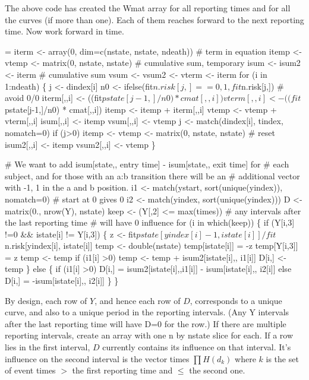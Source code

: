 \documentclass{article}
\begin{document}
The above code has created the Wmat array for all reporting times and
for all the curves (if more than one). 
Each of them reaches forward to the next reporting time.
Now work forward in time.

\begin{nwchunk}
=
 iterm <- array(0, dim=c(nstate, nstate, ndeath)) # term in equation
 itemp <- vtemp <- matrix(0, nstate, nstate)  # cumulative sum, temporary
 isum  <- isum2 <- iterm  # cumulative sum
 vsum  <- vsum2 <- vterm <- iterm
 for (i in 1:ndeath) \{
     j <- dindex[i]
     n0 <- ifelse(fit$n.risk[j,] ==0, 1, fit$n.risk[j,]) # avoid 0/0
     iterm[,,i] <- ((fit$pstate[j-1,]/n0) * cmat[,,i]) %
     vterm[,,i] <- ((fit$pstate[j-1,]/n0) * cmat[,,i]) %
     itemp <- itemp + iterm[,,i]
     vtemp <- vtemp + vterm[,,i]
     isum[,,i] <- itemp
     vsum[,,i] <- vtemp
     j <- match(dindex[i], tindex, nomatch=0)
     if (j>0) itemp <- vtemp <- matrix(0, nstate, nstate)  # reset
     isum2[,,i] <- itemp
     vsum2[,,i] <- vtemp
 \}
 
 # We want to add isum[state,, entry time] - isum[state,, exit time] for
 #  each subject, and for those with an a:b transition there will be an 
 #  additional vector with -1, 1 in the a and b position.
 i1 <- match(ystart, sort(unique(yindex)), nomatch=0) # start at 0 gives 0
 i2 <- match(yindex, sort(unique(yindex)))
 D <- matrix(0., nrow(Y), nstate)
 keep <- (Y[,2] <= max(times))  # any intervals after the last reporting time
                                 # will have 0 influence
 for (i in which(keep)) \{
     if (Y[i,3] !=0 && istate[i] != Y[i,3]) \{
         z <- fit$pstate[yindex[i]-1, istate[i]]/fit$n.risk[yindex[i], istate[i]]
         temp <- double(nstate)
         temp[istate[i]] = -z
         temp[Y[i,3]]    =  z
         temp <- temp %
         if (i1[i] >0) temp <- temp + isum2[istate[i],, i1[i]]
         D[i,] <- temp
     \}
     else \{
         if (i1[i] >0) D[i,] = isum2[istate[i],,i1[i]] - isum[istate[i],, i2[i]]
         else  D[i,] =  -isum[istate[i],, i2[i]]
     \}
 \}
\end{nwchunk}

By design, each row of $Y$, and hence each row of $D$, corresponds to a unique
curve, and also to a unique period in the reporting intervals.
(Any Y intervals after the last reporting time will have D=0 for the row.)
If there are multiple reporting intervals, create an array with one
n by nstate slice for each.
If a row lies in the first interval, $D$ currently contains its influence
on that interval.  It's influence on the second interval is the vector times
$\prod H(d_k)$ where $k$ is the set of event times $>$ the first reporting time
and $\le$ the second one.  
 
\end{document}
